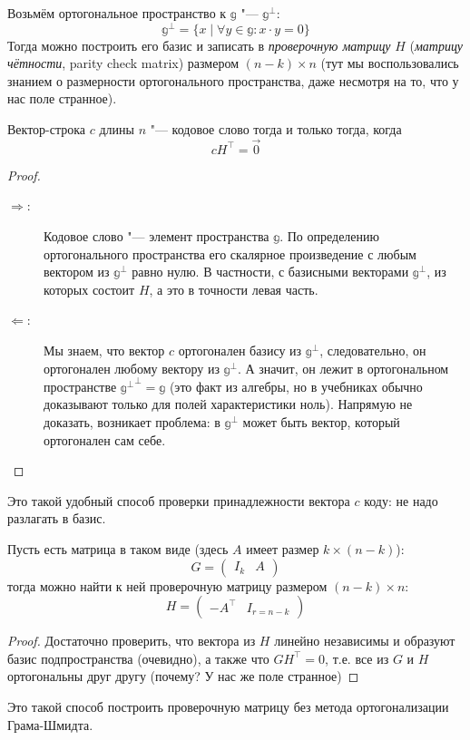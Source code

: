 \begin{Def}
Возьмём ортогональное пространство к $\mathbb g$ "--- $\mathbb g^{\bot}$:
\[
	\mathbb g^{\bot} = \{ x \mid \forall y \in \mathbb g \colon x \cdot y = 0 \}
\]
Тогда можно построить его базис и записать в \textit{проверочную матрицу} $H$
(\textit{матрицу чётности}, parity check matrix) размером $(n-k)\times n$
(тут мы воспользовались знанием о размерности ортогонального пространства,
даже несмотря на то, что у нас поле странное).
\end{Def}
\begin{lemma}
	Вектор-строка $c$ длины $n$ "--- кодовое слово тогда и только тогда, когда
	\[
		c H^\top = \vec 0
	\]
\end{lemma}
\begin{proof}
	\begin{description}
	\item[$\Rightarrow$:]
		Кодовое слово "--- элемент пространства $\mathbb g$.
		По определению ортогонального пространства его скалярное произведение
		с любым вектором из $\mathbb g^\bot$ равно нулю.
		В частности, с базисными векторами $\mathbb g^\bot$, из которых состоит $H$,
		а это в точности левая часть.
	\item[$\Leftarrow$:]
		Мы знаем, что вектор $c$ ортогонален базису из $\mathbb g^\bot$,
		следовательно, он ортогонален любому вектору из $\mathbb g^\bot$.
		А значит, он лежит в ортогональном пространстве ${\mathbb g^\bot}^\bot=\mathbb g$
		(это факт из алгебры, но в учебниках обычно доказывают только для
		полей характеристики ноль).
		Напрямую не доказать, возникает проблема: в $\mathbb g^\bot$
		может быть вектор, который ортогонален сам себе.
	\end{description}
\end{proof}
\begin{Rem}
	Это такой удобный способ проверки принадлежности вектора $c$
	коду: не надо разлагать в базис.
\end{Rem}

\begin{lemma}
	Пусть есть матрица в таком виде (здесь $A$ имеет размер $k\times(n-k)$):
	\[
		G = \left(\begin{array}{c|c} I_k & A \end{array}\right)
	\]
	тогда можно найти к ней проверочную матрицу размером $(n-k)\times n$:
	\[
		H = \left(\begin{array}{c|c} -A^\top & I_{r=n-k} \end{array}\right)
	\]
\end{lemma}
\begin{proof}
	Достаточно проверить, что вектора из $H$ линейно независимы и образуют
	базис подпространства (очевидно), а также что $GH^\top=0$, т.е. все
	из $G $ и $H$ ортогональны друг другу (\TODO почему? У нас же поле странное)
	\TODO
\end{proof}
\begin{Rem}
	Это такой способ построить проверочную матрицу
	без метода ортогонализации Грама-Шмидта.
\end{Rem}

